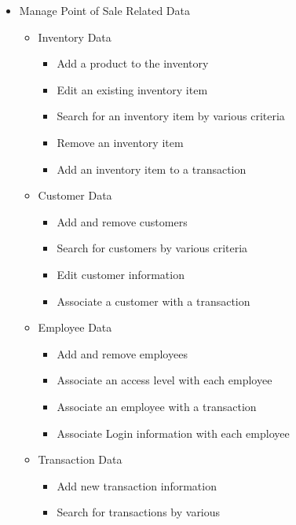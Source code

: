 \documentclass{report}
\begin{document}
        \begin{itemize}
            \item {Manage Point of Sale Related Data}
            \begin{itemize}
                \item {Inventory Data}
                \begin{itemize}
                    \item {Add a product to the inventory}
                    \item {Edit an existing inventory item}
                    \item {Search for an inventory item by various criteria}
                    \item {Remove an inventory item}
                    \item {Add an inventory item to a transaction}
                \end{itemize}
                \item{Customer Data}
                \begin{itemize}
                    \item{Add and remove customers}
                    \item{Search for customers by various criteria}
                    \item{Edit customer information}
                    \item{Associate a customer with a transaction}
                \end{itemize}
                \item {Employee Data}
                \begin{itemize}
                    \item{Add and remove employees}
                    \item{Associate an access level with each employee}
                    \item{Associate an employee with a
                    transaction}
                    \item{Associate Login information with each
                    employee}
                \end{itemize}
                \item{Transaction Data}
                \begin{itemize}
                    \item{Add new transaction information}
                    \item{Search for transactions by various
}
\end{itemize}
\end{itemize}
\end{itemize}
\end{document}

